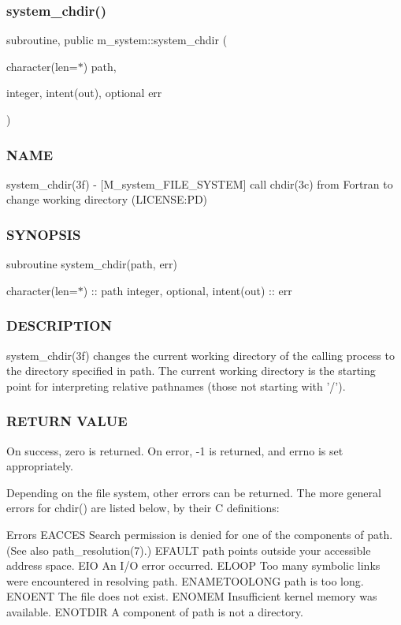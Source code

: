 \subsubsection{\texorpdfstring{system\+\_\+chdir()}{system\_chdir()}}
{\footnotesize\ttfamily subroutine, public m\+\_\+system\+::system\+\_\+chdir (\begin{DoxyParamCaption}\item[{character(len=$\ast$)}]{path,  }\item[{integer, intent(out), optional}]{err }\end{DoxyParamCaption})}



\subsubsection*{N\+A\+ME}

system\+\_\+chdir(3f) -\/ \mbox{[}M\+\_\+system\+\_\+\+F\+I\+L\+E\+\_\+\+S\+Y\+S\+T\+EM\mbox{]} call chdir(3c) from Fortran to change working directory (L\+I\+C\+E\+N\+SE\+:PD) \subsubsection*{S\+Y\+N\+O\+P\+S\+IS}

subroutine system\+\_\+chdir(path, err)

character(len=$\ast$) \+:\+: path integer, optional, intent(out) \+:\+: err

\subsubsection*{D\+E\+S\+C\+R\+I\+P\+T\+I\+ON}

\begin{DoxyVerb}system_chdir(3f) changes the current working directory of the calling
process to the directory specified in path. The current working
directory is the starting point for interpreting relative pathnames
(those not starting with '/').
\end{DoxyVerb}


\subsubsection*{R\+E\+T\+U\+RN V\+A\+L\+UE}

\begin{DoxyVerb}On success, zero is returned. On error, -1 is returned, and errno is
set appropriately.


Depending on the file system, other errors can be returned. The more
general errors for chdir() are listed below, by their C definitions:

Errors
EACCES        Search permission is denied for one of the components of path.
              (See also path_resolution(7).)
EFAULT        path points outside your accessible address space.
EIO           An I/O error occurred.
ELOOP         Too many symbolic links were encountered in resolving path.
ENAMETOOLONG  path is too long.
ENOENT        The file does not exist.
ENOMEM        Insufficient kernel memory was available.
ENOTDIR       A component of path is not a directory.
\end{DoxyVerb}



